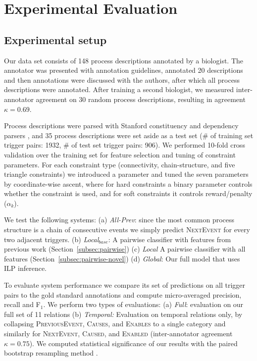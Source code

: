 \section{Experimental Evaluation}

\subsection{Experimental setup} \label{subsec:setup}

Our data set consists of 148 process descriptions annotated by a biologist. The annotator was presented with annotation guidelines, annotated 20 descriptions and then annotations were discussed with the authors, after which all process descriptions were annotated. After training a second biologist, we measured inter-annotator agreement on 30 random process descriptions, resulting in agreement $\kappa=0.69$. 

Process descriptions were parsed with Stanford constituency and dependency parsers \cite{Klein03,Marneffe06}, and 35 process descriptions were set aside as a test set (\# of training set trigger pairs: 1932, \# of test set trigger pairs: 906). We performed 10-fold cross validation over the training set for feature selection and tuning of constraint parameters. For each constraint type (connectivity, chain-structure, and five triangle constraints) we introduced a parameter and tuned the seven parameters by coordinate-wise ascent, where for hard constraints a binary parameter controls whether the constraint is used, and for soft constraints it controls reward/penalty ($\alpha_k$).

We test the following systems: (a) \emph{All-Prev}: since the most common process structure is a chain of consecutive events we simply predict \textsc{NextEvent} for every two adjacent triggers. (b) \emph{Local$_{base}$}: A pairwise classifier with features from previous work (Section~\ref{subsec:pairwise}) (c) \emph{Local} A pairwise classifier with all features (Section~\ref{subsec:pairwise-novel}) (d) \emph{Global}: Our full model that uses ILP inference.


To evaluate system performance we compare its set of predictions on all trigger pairs to the gold standard annotations and compute micro-averaged precision, recall and F$_1$. We perform two types of evaluations: (a) \emph{Full}: evaluation on our full set of 11 relations (b) \emph{Temporal:} Evaluation on temporal relations only, by collapsing \textsc{PreviousEvent}, \textsc{Causes}, and \textsc{Enables} to a single category and similarly for \textsc{NextEvent}, \textsc{Caused}, and \textsc{Enabled} (inter-annotator agreement $\kappa=0.75$). We computed statistical significance of our results with the paired bootstrap resampling method \cite{efron1993}.

